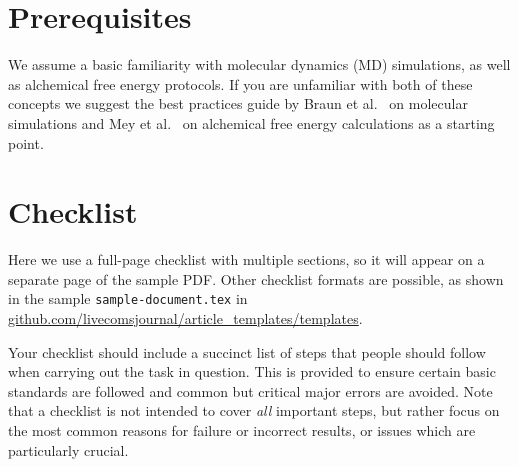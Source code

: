 \documentclass[9pt,bestpractices]{livecoms}
\begin{document}
\section{Prerequisites}
We assume a basic familiarity with molecular dynamics (MD) simulations, as well as alchemical free energy protocols. If you are unfamiliar with both of these concepts we suggest the best practices guide by Braun et al.~\cite{braunBestPracticesFoundations2019} on molecular simulations and Mey et al.~\cite{meyBestPracticesAlchemical2020} on alchemical free energy calculations as a starting point. 

\section{Checklist}
Here we use a full-page checklist with multiple sections, so it will appear on a separate page of the sample PDF.
Other checklist formats are possible, as shown in the sample \texttt{sample-document.tex} in \url{github.com/livecomsjournal/article_templates/templates}.

Your checklist should include a succinct list of steps that people should follow when carrying out the task in question.
This is provided to ensure certain basic standards are followed and common but critical major errors are avoided.
Note that a checklist is not intended to cover \emph{all} important steps, but rather focus on the most common reasons for failure or incorrect results, or issues which are particularly crucial.


\end{document}
